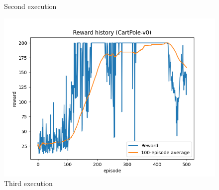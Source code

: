 \documentclass[12pt]{article}
\begin{document}
\begin{figure}[H]
\begin{minipage}{0.32\textwidth}
     \caption{Second execution}
     \label{fig:task-2-v2}
   \end{minipage}
   \begin{minipage}{0.32\textwidth}
     \centering
     \includegraphics[width=\linewidth]{exercise-1/report/img/task-2-v3.png}
     \caption{Third execution}
     \label{fig:task-2-v3}
   \end{minipage}
\end{figure}
\end{document}
